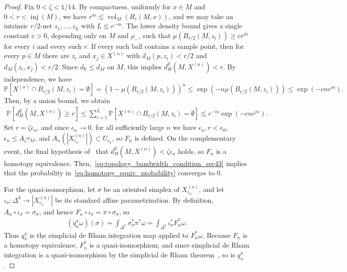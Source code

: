 \documentclass[11pt,reqno]{amsproc}
\numberwithin{equation}{section}
\newcommand{\R}{\mathbb{R}}
\newcommand{\PP}{\mathbb{P}}
\newcommand{\ls}{\lesssim}
\newcommand{\vol}{\operatorname{vol}}
\newcommand{\inj}{\operatorname{inj}}
\newcommand{\ball}[3]{B_{#3}(#1, #2)} %
\theoremstyle{definition}
\theoremstyle{plain}
\begin{document}
    \begin{proof}
        Fix $0<\zeta<1/14$. By compactness, uniformly for $x\in M$ and $0<r<\inj(M)$, we have $r^m\ls\vol_M(\ball{M}{x}{r})$, and we may take an intrinsic $r/2$-net $z_1,\ldots,z_L$ with $L\ls r^{-m}$. The lower density bound gives a single constant $c>0$, depending only on $M$ and $\rho_-$, such that $\mu(\ball{M}{z_i}{r/2})\geq cr^m$ for every $i$ and every such $r$. If every such ball contains a sample point, then for every $p\in M$ there are $z_i$ and $x_j\in X^{(n)}$ with $d_M(p,z_i)<r/2$ and $d_M(z_i,x_j)<r/2$. Since $d_\R\leq d_M$ on $M$, this implies $d_H^\R(M,X^{(n)})<r$. By independence, we have
        \begin{equation}
        \PP\left[X^{(n)}\cap \ball{M}{z_i}{r/2}=\emptyset\right] = (1 - \mu(\ball{M}{z_i}{r/2}))^n \leq \exp(-n\mu(\ball{M}{z_i}{r/2}))\leq \exp(-c n r^m).
        \end{equation}
        Then, by a union bound, we obtain
        \begin{align} \label{eq:homotopy_equiv_probability}
            \PP\left[d_H^\R(M,X^{(n)})\geq r\right]
            \leq \sum_{i=1}^L \PP\left[X^{(n)}\cap \ball{M}{z_i}{r/2}=\emptyset\right]
            \ls r^{-m}\exp(-cnr^m).
        \end{align}
        Set $r=\zeta\epsilon_n$, and since $\epsilon_n\to0$, for all sufficiently large $n$ we have $\epsilon_n, r<\epsilon_0$, $\epsilon_n\leq A_\zeta\tau_M$, and $A_n(|X^{(n)}_{\epsilon_n}|)\subset U_{\epsilon_n}$, so $F_n$ is defined.  On the complementary event, the final hypothesis of~ that $d_{H}^\R(M, X^{(n)}) < \zeta\epsilon_n$ holds, so $F_n$ is a homotopy equivalence. Then,~\eqref{eq:topology_bandwidth_condition_sec43} implies that the probability in~\eqref{eq:homotopy_equiv_probability} converges to $0$.

        For the quasi-isomorphism, let $\sigma$ be an oriented simplex of $X^{(n)}_{\epsilon_n}$, and let $\iota_\sigma:\Delta^k\to |X^{(n)}_{\epsilon_n}|$ be its standard affine parametrization. By definition, $A_n\circ\iota_\sigma=\sigma_\sigma$, and hence $F_n\circ\iota_\sigma=\pi\circ\sigma_\sigma$, so
        \begin{align}
            (q_n^\pi\omega)(\sigma)=\int_{\Delta^k}\sigma_\sigma^*\pi^*\omega
            =\int_{\Delta^k}\iota_\sigma^*F_n^*\omega.
        \end{align}
        Thus $q_n^\pi$ is the simplicial de Rham integration map applied to $F_n^*\omega$.  Because $F_n$ is a homotopy equivalence, $F_n^*$ is a quasi-isomorphism; and  since simplicial de Rham integration is a quasi-isomorphism by the simplicial de Rham theorem~\cite{Whitney1957}, so is $q_n^\pi$.
    \end{proof}
\end{document}
